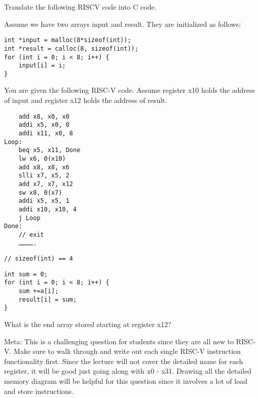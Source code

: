 \begin{blocksection}
\question
Translate the following RISCV code into C code.

Assume we have two arrays input and result. They are initialized as follows:

\begin{verbatim}
int *input = malloc(8*sizeof(int));
int *result = calloc(8, sizeof(int));
for (int i = 0; i < 8; i++) {
	input[i] = i;
}
\end{verbatim}

You are given the following RISC-V code. Assume register x10 holds the address of input and register x12 holds the address of result. 

\begin{verbatim}
	add x8, x0, x0
	addi x5, x0, 0
	addi x11, x0, 8
Loop:
	beq x5, x11, Done
	lw x6, 0(x10)
	add x8, x8, x6
	slli x7, x5, 2
	add x7, x7, x12
	sw x8, 0(x7)
	addi x5, x5, 1
	addi x10, x10, 4
	j Loop
Done:
	// exit
	………….
\end{verbatim}

\begin{verbatim}
// sizeof(int) == 4
\end{verbatim}








\begin{solution}
\begin{verbatim}
int sum = 0;
for (int i = 0; i < 8; i++) {
	sum +=a[i];
	result[i] = sum;
}
\end{verbatim}
\end{solution}

What is the end array stored starting at register x12?

\begin{solution}
[0, 1, 3, 6, 10, 15, 21, 28]

Meta: This is a challenging question for students since they are all new to RISC-V. Make sure to walk through and write out each single RISC-V instruction functionality first. Since the lecture will not cover the detailed name for each register, it will be good just going along with x0 - x31. Drawing all the detailed memory diagram will be helpful for this question since it involves a lot of load and store instructions. 
\end{solution}
\end{blocksection}